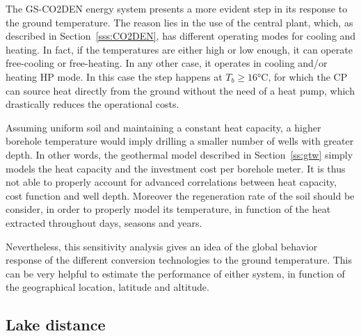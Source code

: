 \documentclass{article}
\begin{document}
The GS-CO2DEN energy system presents a more evident step in its response to the ground temperature. The reason lies in the use of the central plant, which, as described in Section~\ref{sss:CO2DEN}, has different operating modes for cooling and heating. In fact, if the temperatures are either high or low enough, it can operate free-cooling or free-heating. In any other case, it operates in cooling and/or heating HP mode. In this case the step happens at $T_{b} \geq 16 \si{\celsius}$, for which the CP can source heat directly from the ground without the need of a heat pump, which drastically reduces the operational costs.

Assuming uniform soil and maintaining a constant heat capacity, a higher borehole temperature would imply drilling a smaller number of wells with greater depth. In other words, the geothermal model described in Section~\ref{ss:gtw} simply models the heat capacity and the investment cost per borehole meter. It is thus not able to properly account for advanced correlations between heat capacity, cost function and well depth. Moreover the regeneration rate of the soil should be consider, in order to properly model its temperature, in function of the heat extracted throughout days, seasons and years.

Nevertheless, this sensitivity analysis gives an idea of the global behavior response of the different conversion technologies to the ground temperature. This can be very helpful to estimate the performance of either system, in function of the geographical location, latitude and altitude.


\subsection{Lake distance}

%
\end{document}
